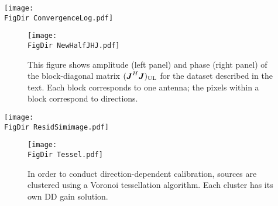 \documentclass[useAMS,usenatbib]{mn2e}
\newcommand{\mat}[1]{{\bmath{#1}}}
\newcommand{\JJ}{\mat{J}} %
\newcommand{\JHJ}{\JJ^H\JJ} %
\newcommand{\UL}{\mathrm{UL}}%
\newcommand{\FigDir}{../Figures/}
\newcommand{\COH}{{\sc CohJones}}
\begin{document}
\begin{figure*}
\begin{center}
\texttt{[image: \\FigDir ConvergenceLog.pdf]}
\caption{\label{fig:Convergence} Amplitude (top row) and phase (bottom row) of the difference between
  the estimated and true gains, as a function of iteration. Columns correspond to directions.
  Different lines correspond to different antennas.}
\end{center}
\end{figure*}

\begin{figure}
\begin{center}
\texttt{[image: \\FigDir NewHalfJHJ.pdf]}
\caption{\label{fig:HalfJHJ} This figure shows amplitude (left panel)
  and phase (right panel) of the block-diagonal matrix $(\JHJ)_\UL$
  for the dataset described in the text. Each block corresponds to one antenna;
  the pixels within a block correspond to directions.}
\end{center}
\end{figure}

\begin{figure*}
\begin{center}
\texttt{[image: \\FigDir ResidSimimage.pdf]}
\caption{\label{fig:resid}Simulation with time-variable DD gains. We show a deconvolved image (left) where
  no DD solutions have been applied, a residual image (centre) made by subtracting the sky model (in the visibility 
  plane) without any DD corrections, and a residual image (right) made by subtracting the sky model with \COH-estimated 
  DD gain solutions (right). The color scale is the same in all panels. In this simulation, applying \COH\ for DD calibration reduces the residual rms level by a factor of $\sim4$.}
\end{center}
\end{figure*}

\begin{figure}
\begin{center}
\texttt{[image: \\FigDir Tessel.pdf]}
\caption{\label{fig:tessel} In order to conduct direction-dependent calibration, sources are clustered using a 
Voronoi tessellation algorithm. Each cluster has its own DD gain solution.}
\end{center}
\end{figure}
\end{document}
